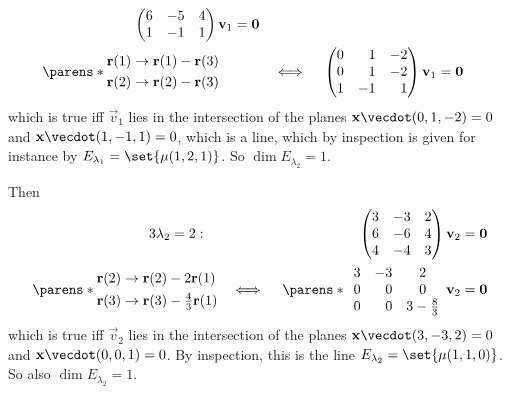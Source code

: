 \documentclass[fleqn,a4paper,11pt]{article}
\begin{document}
\begin{enumerate}[label=\textbf{\arabic*.}]
\begin{enumerate}[label=(\textbf{\Alph*})]
\begin{enumerate}[label=(\roman*)]
\begin{alignat*}
\begin{pmatrix}
         6 & -5 & 4 \\
         1 & -1 & 1
        \end{pmatrix}
        \vec v_1 &= \vec 0 \\
        \parens*{
         \begin{aligned}
          \vec r(1) &\to \vec r(1) - \vec r(3) \\
          \vec r(2) &\to \vec r(2) - \vec r(3) \\
         \end{aligned}
        }\quad
        && \iff{}&&\begin{pmatrix*}[r]
         0 & 1 & -2 \\
         0 & 1 & -2 \\
         1 & -1 & 1
        \end{pmatrix*}
        \vec v_1 &= \vec 0
       \end{alignat*}
       which is true iff \(\vec v_1\) lies in the intersection of the planes
       \(\vec x \vecdot \vec(0, 1, -2) = 0\) and
       \(\vec x \vecdot \vec(1, -1, 1) = 0\), which is a line, which by
       inspection is given for instance by
       \(E_{\lambda_1} = \set{\mu (1, 2, 1)}\). So
       \(\dim E_{\lambda_2} = 1\).

       Then
       \begin{alignat*}3
        \lambda_2 = 2:\quad&&
        &&\begin{pmatrix}
         3 & -3 & 2 \\
         6 & -6 & 4 \\
         4 & -4 & 3
        \end{pmatrix}
        \vec v_2 &= \vec 0 \\
        \parens*{
         \begin{aligned}
          \vec r(2) &\to \vec r(2) - 2\vec r(1) \\
          \vec r(3) &\to \vec r(3) - \tfrac 43\vec r(1)
         \end{aligned}
        }
        &&\iff{}&&\parens*{\begin{array}{crc}
         3 & -3 & 2 \\
         0 & 0 & 0 \\
         0 & 0 & 3 - \tfrac 83
        \end{array}}
        \vec v_2 &= \vec 0 \\
       \end{alignat*}
       which is true iff \(\vec v_2\) lies in the intersection of the planes
       \(\vec x \vecdot (3, -3, 2) = 0\) and
       \(\vec x \vecdot (0, 0, 1) = 0\). By inspection, this is the line
       \(E_{\lambda_2} = \set{\mu(1, 1, 0)}\). So also
       \(\dim E_{\lambda_2} = 1\).


\end{enumerate}
\end{enumerate}
\end{enumerate}
\end{document}
